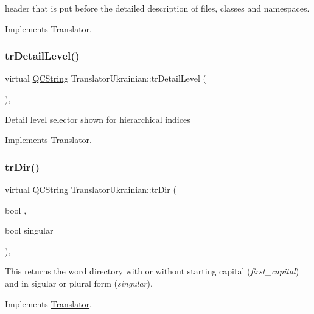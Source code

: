 header that is put before the detailed description of files, classes and namespaces. 

Implements \mbox{\hyperlink{class_translator}{Translator}}.

\mbox{\label{class_translator_ukrainian_ab66afd7fa34f38ecf569d895c1c9e153}} 
\subsubsection{\texorpdfstring{trDetailLevel()}{trDetailLevel()}}
{\footnotesize\ttfamily virtual \mbox{\hyperlink{class_q_c_string}{Q\+C\+String}} Translator\+Ukrainian\+::tr\+Detail\+Level (\begin{DoxyParamCaption}{ }\end{DoxyParamCaption})\hspace{0.3cm}{\ttfamily [inline]}, {\ttfamily [virtual]}}

Detail level selector shown for hierarchical indices 

Implements \mbox{\hyperlink{class_translator}{Translator}}.

\mbox{\label{class_translator_ukrainian_a01f332ff6918c2cc3c51d08fa098049e}} 
\subsubsection{\texorpdfstring{trDir()}{trDir()}}
{\footnotesize\ttfamily virtual \mbox{\hyperlink{class_q_c_string}{Q\+C\+String}} Translator\+Ukrainian\+::tr\+Dir (\begin{DoxyParamCaption}\item[{bool}]{,  }\item[{bool}]{singular }\end{DoxyParamCaption})\hspace{0.3cm}{\ttfamily [inline]}, {\ttfamily [virtual]}}

This returns the word directory with or without starting capital ({\itshape first\+\_\+capital}) and in sigular or plural form ({\itshape singular}). 

Implements \mbox{\hyperlink{class_translator}{Translator}}.

